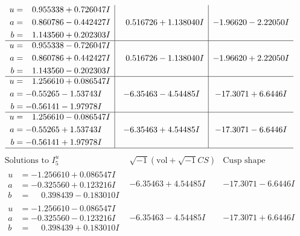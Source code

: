 \documentclass[1p]{elsarticle_modified}
\theoremstyle{definition}
\newcommand{\I}{\sqrt{-1}}
\begin{document}
$$\begin{array}{c|c|c}
\begin{aligned}
u &= \phantom{-}0.955338 + 0.726047 I \\
a &= \phantom{-}0.860786 - 0.442427 I \\
b &= \phantom{-}1.143560 + 0.202303 I\end{aligned}
 & \phantom{-}0.516726 + 1.138040 I & -1.96620 - 2.22050 I \\ \hline\begin{aligned}
u &= \phantom{-}0.955338 - 0.726047 I \\
a &= \phantom{-}0.860786 + 0.442427 I \\
b &= \phantom{-}1.143560 - 0.202303 I\end{aligned}
 & \phantom{-}0.516726 - 1.138040 I & -1.96620 + 2.22050 I \\ \hline\begin{aligned}
u &= \phantom{-}1.256610 + 0.086547 I \\
a &= -0.55265 - 1.53743 I \\
b &= -0.56141 - 1.97978 I\end{aligned}
 & -6.35463 - 4.54485 I & -17.3071 + 6.6446 I \\ \hline\begin{aligned}
u &= \phantom{-}1.256610 - 0.086547 I \\
a &= -0.55265 + 1.53743 I \\
b &= -0.56141 + 1.97978 I\end{aligned}
 & -6.35463 + 4.54485 I & -17.3071 - 6.6446 I\\
 \hline 
 \end{array}$$\newpage$$\begin{array}{c|c|c}  
\text{Solutions to }I^u_{5}& \I (\text{vol} + \sqrt{-1}CS) & \text{Cusp shape}\\
 \hline 
\begin{aligned}
u &= -1.256610 + 0.086547 I \\
a &= -0.325560 + 0.123216 I \\
b &= \phantom{-}0.398439 - 0.183010 I\end{aligned}
 & -6.35463 + 4.54485 I & -17.3071 - 6.6446 I \\ \hline\begin{aligned}
u &= -1.256610 - 0.086547 I \\
a &= -0.325560 - 0.123216 I \\
b &= \phantom{-}0.398439 + 0.183010 I\end{aligned}
 & -6.35463 - 4.54485 I & -17.3071 + 6.6446 I \\ \hline\begin{aligned}

\end{aligned}
\end{array}$$
\end{document}
